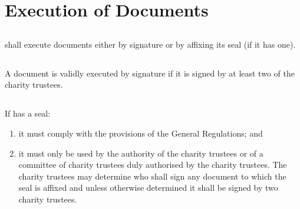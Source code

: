 \section{Execution of Documents}\label{sec:documents}

    \subsection{}
    \shortname{} shall execute documents either by signature or by affixing its seal (if it has one).

    \subsection{}
    A document is validly executed by signature if it is signed by at least two of the charity trustees.

    \subsection{}
    If \shortname{} has a seal:
    \begin{enumerate}
        \item it must comply with the provisions of the General Regulations; and
        \item it must only be used by the authority of the charity trustees or of a committee of charity trustees duly authorised by the charity trustees. The charity trustees may determine who shall sign any document to which the seal is affixed and unless otherwise determined it shall be signed by two charity trustees.
    \end{enumerate}

